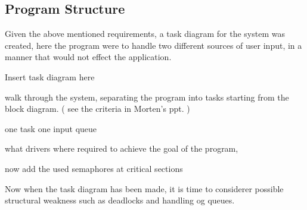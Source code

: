 \subsection{Program Structure}
\label{sec:ProgramStructure}

Given the above mentioned requirements, a task diagram for the system was created, here the program were to handle two different sources of user input, in a manner that would not effect the application. 

Insert task diagram here 


walk through the system, separating the program into tasks starting from the block diagram. ( see the criteria in Morten's ppt. )

one task one input queue

what drivers where required to achieve the goal of the program,

now add the used semaphores at critical sections

Now when the task diagram has been made, it is time to considerer possible structural weakness such as deadlocks and handling og queues. 

